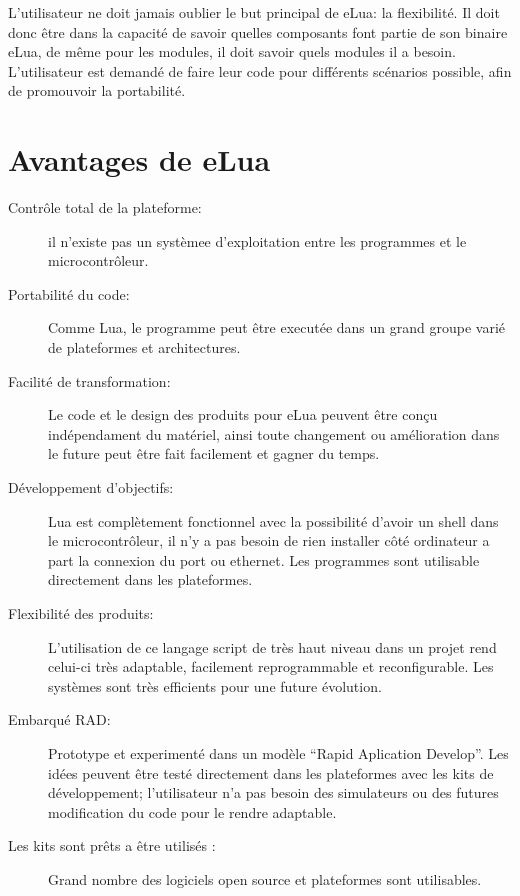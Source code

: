 L'utilisateur ne doit jamais oublier le but principal de eLua: la flexibilité. Il doit donc être dans la capacité de savoir quelles composants font partie
de son binaire eLua, de même pour les modules, il doit savoir quels modules il a besoin.
L'utilisateur est demandé de faire leur code pour différents scénarios possible, afin de promouvoir la portabilité.

\section{Avantages de eLua}

\begin{description}

 \item[Contrôle total de la plateforme:] il n'existe pas un systèmee d'exploitation entre les programmes et le microcontrôleur.
 
 \item[Portabilité du code:] Comme Lua, le programme peut être executée dans un grand groupe varié de plateformes et architectures.

 \item[Facilité de transformation:] Le code et le design des produits pour eLua peuvent être conçu indépendament du matériel, ainsi toute changement ou
amélioration dans le future peut être fait facilement et gagner du temps.

 \item[Développement d'objectifs:] Lua est complètement fonctionnel avec la possibilité d'avoir un shell dans le microcontrôleur, il n'y a pas besoin 
de rien installer côté ordinateur a part la connexion du port ou ethernet. Les programmes sont utilisable directement dans les plateformes.

 \item[Flexibilité des produits:] L'utilisation de ce langage script de très haut niveau dans un projet rend celui-ci très adaptable, facilement
reprogrammable et reconfigurable. Les systèmes sont très efficients pour une future évolution.

 \item[Embarqué RAD:] Prototype et experimenté dans un modèle ``Rapid Aplication Develop''. Les idées peuvent être testé directement dans les plateformes
avec les kits de développement; l'utilisateur n'a pas besoin des simulateurs ou des futures modification du code pour le rendre adaptable.

 \item[Les kits sont prêts a être utilisés :] Grand nombre des logiciels open source et plateformes sont utilisables.


\end{description}
